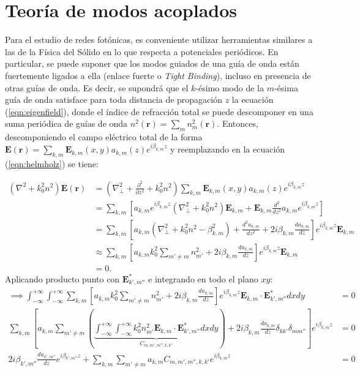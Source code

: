 \section{Teoría de modos acoplados}
	Para el estudio de redes fotónicas, es conveniente utilizar herramientas similares a las de la Física del Sólido en lo que respecta a potenciales periódicos. En particular, se puede suponer que los modos guiados de una guía de onda están fuertemente ligados a ella (enlace fuerte o \textit{Tight Binding}), incluso en presencia de otras guías de onda. Es decir, se supondrá que el $k$-ésimo modo de la $m$-ésima guía de onda satisface para toda distancia de propagación $z$ la ecuación (\ref{eqn:eigenfield}), donde el índice de refracción total se puede descomponer en una suma periódica de guías de onda $n^2(\textbf{r}) = \sum_{m} n^2_m(\textbf{r})$. Entonces, descomponiendo el campo eléctrico total de la forma $\textbf{E}(\textbf{r}) = \sum_{k, m} \textbf{E}_{k, m}(x, y) a_{k, m}(z) e^{i\beta_{k, m} z}$ y reemplazando en la ecuación (\ref{eqn:helmholz}) se tiene:

\begin{align}
	(\nabla^2  + k_0^2n^2) \textbf{E}(\textbf{r}) &= \left(\nabla_\perp^2 + \frac{\partial^2}{\partial z^2} + k_0^2n^2 \right)\sum_{k, m} \textbf{E}_{k, m}(x, y) a_{k, m}(z) e^{i\beta_{k, m} z}
	\nonumber
	\\
	&= \sum_{k, m} \left[a_{k, m} e^{i\beta_{k, m} z} \left(\nabla_\perp^2 +k_0^2n^2 \right)\textbf{E}_{k, m} + \textbf{E}_{k, m}\frac{d^2}{d z^2}a_{k, m} e^{i\beta_{k, m} z}\right]
	\nonumber	
	\\
	&= \sum_{k, m} \left[a_{k, m}  \left(\nabla_\perp^2 +k_0^2n^2 -\beta_{k,m}^2 \right) + \frac{d^2 a_{k, m}}{d z^2}  +2i\beta_{k,m}\frac{d a_{k, m}}{d z} \right]e^{i\beta_{k, m} z}\textbf{E}_{k, m}
		\nonumber	
	\\
	&\approx \sum_{k, m} \left[a_{k, m}  k_0^2\sum_{m'\neq m} n^2_{m'} +2i\beta_{k,m}\frac{d a_{k, m}}{d z} \right]e^{i\beta_{k, m} z}\textbf{E}_{k, m}
	\nonumber	
	\\
	&= 0.
	\nonumber	
\end{align}
Aplicando producto punto con $\textbf{E}_{k', m''}^*$ e integrando en todo el plano $xy$:
\begin{align}
	\implies 
	  \int_{-\infty}^{+\infty}\int_{-\infty}^{+\infty} \sum_{k, m} \left[a_{k, m}  k_0^2\sum_{m'\neq m} n^2_{m'}  +2i\beta_{k,m}\frac{d a_{k, m}}{d z} \right]e^{i\beta_{k, m} z}\textbf{E}_{k, m} \cdot \textbf{E}_{k', m''}^* dxdy &= 0
	  \nonumber
	  \\
	  \sum_{k, m} \left[a_{k, m}  \sum_{m'\neq m}\left( \underbrace{\int_{-\infty}^{+\infty}\int_{-\infty}^{+\infty} k_0^2n^2_{m'} \textbf{E}_{k, m} \cdot \textbf{E}_{k', m''}^* dxdy}_{C_{m, m', m'', k, k'}}\right) +2i\beta_{k,m}\frac{d a_{k, m}}{d z}\delta_{kk'}\delta_{mm''} \right]e^{i\beta_{k, m} z} &= 0
	  	  \nonumber
	  \\
2i\beta_{k',m''}\frac{d a_{k', m''}}{d z}e^{i\beta_{k', m''} z} +	  \sum_{k, m} \sum_{m'\neq m}  a_{k, m}  C_{m, m', m'', k, k'}e^{i\beta_{k, m} z}   &= 0
	\label{eqn:CMT1}
\end{align}

	
